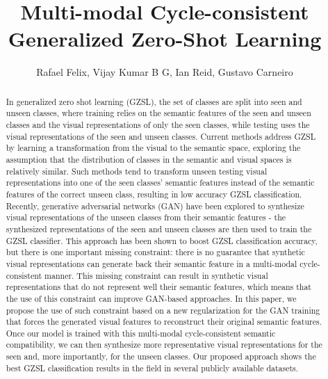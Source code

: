 \documentclass[runningheads]{llncs}
\begin{document}
\pagestyle{headings}
\mainmatter
\def\ECCV18SubNumber{2156}  

\title{Multi-modal Cycle-consistent Generalized Zero-Shot Learning}



\author{Rafael Felix, Vijay Kumar B G, Ian Reid, Gustavo Carneiro}


\maketitle

\begin{abstract}
In generalized zero shot learning (GZSL), the set of classes are split into seen and unseen classes, where training relies on the semantic features of the seen and unseen classes and the visual representations of only the seen classes, while testing uses the visual representations of the seen and unseen classes.  Current methods address GZSL by learning a transformation from the visual to the semantic space, exploring the assumption that the distribution of classes in the semantic and visual spaces is relatively similar.  Such methods tend to transform unseen testing visual representations into one of the seen classes' semantic features instead of the semantic features of the correct unseen class, resulting in low accuracy GZSL classification.  Recently, generative adversarial networks (GAN) have been explored to synthesize visual representations of the unseen classes from their semantic features - the synthesized representations of the seen and unseen classes are then used to train the GZSL classifier.  This approach has been shown to boost GZSL classification accuracy, but there is one important missing constraint: there is no guarantee that synthetic visual representations can generate back their semantic feature in a multi-modal cycle-consistent manner.  This missing constraint can result in synthetic visual representations that do not represent well their semantic features, which means that the use of this constraint can improve GAN-based approaches. In this paper, we propose the use of such constraint based on a new regularization for the GAN training that forces the generated visual features to reconstruct their original semantic features. Once our model is trained with this multi-modal cycle-consistent semantic compatibility, we can then synthesize more representative visual representations for the seen and, more importantly, for the unseen classes.  Our proposed approach shows the best GZSL classification results in the field in several publicly available datasets.
\end{abstract}
\end{document}

